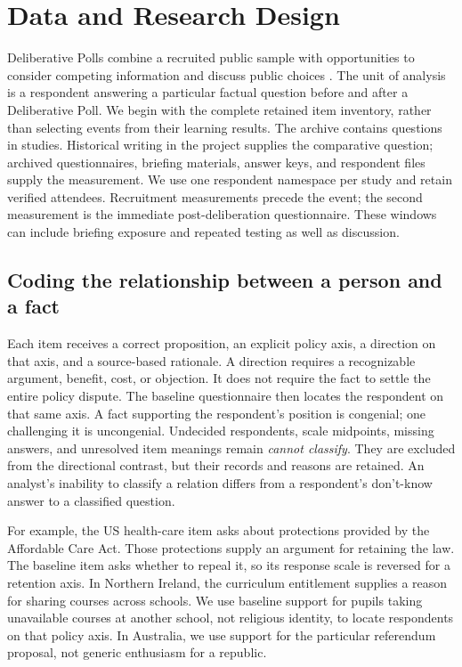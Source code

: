 \section{Data and Research Design}

Deliberative Polls combine a recruited public sample with opportunities to consider competing information and discuss public choices \citep{fishkin2005}. The unit of analysis is a respondent answering a particular factual question before and after a Deliberative Poll. We begin with the complete retained item inventory, rather than selecting events from their learning results. The archive contains \inventoryItems{} questions in \inventoryStudies{} studies. Historical writing in the project supplies the comparative question; archived questionnaires, briefing materials, answer keys, and respondent files supply the measurement. We use one respondent namespace per study and retain verified attendees. Recruitment measurements precede the event; the second measurement is the immediate post-deliberation questionnaire. These windows can include briefing exposure and repeated testing as well as discussion.

\subsection{Coding the relationship between a person and a fact}

Each item receives a correct proposition, an explicit policy axis, a direction on that axis, and a source-based rationale. A direction requires a recognizable argument, benefit, cost, or objection. It does not require the fact to settle the entire policy dispute. The baseline questionnaire then locates the respondent on that same axis. A fact supporting the respondent's position is congenial; one challenging it is uncongenial. Undecided respondents, scale midpoints, missing answers, and unresolved item meanings remain \emph{cannot classify}. They are excluded from the directional contrast, but their records and reasons are retained. An analyst's inability to classify a relation differs from a respondent's don't-know answer to a classified question.

For example, the US health-care item asks about protections provided by the Affordable Care Act. Those protections supply an argument for retaining the law. The baseline item asks whether to repeal it, so its response scale is reversed for a retention axis. In Northern Ireland, the curriculum entitlement supplies a reason for sharing courses across schools. We use baseline support for pupils taking unavailable courses at another school, not religious identity, to locate respondents on that policy axis. In Australia, we use support for the particular referendum proposal, not generic enthusiasm for a republic.

